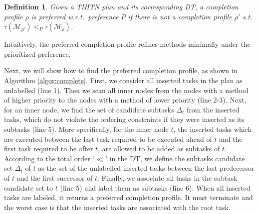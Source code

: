 \documentclass[letterpaper]{article} %
\newtheorem{definition}{Definition}
\newcommand{\Methods}{\mathcal{M}}
\newcommand{\aspprec}{\ll}
\newcommand{\improveFunction}{\rho}
\newcommand{\prefer}{\leq_P}
\newcommand{\strictPrefer}{<_P}
\newcommand{\complete}{\tau}
\newcommand{\inverseComplete}{\complete}
\newcommand{\BEF}{\mathsf{B}}
\newcommand{\AFT}{\mathsf{A}}
\newcommand{\LastBEF}[1]{\mathsf{LastBEF}_{#1}}
\newcommand{\FirstAFT}[1]{\mathsf{FirstAFT}_{#1}}
\newcommand{\SubTCandidates}{\Delta_t}
\begin{document}
\begin{definition}%
Given a TIHTN plan and its corresponding DT, a completion profile $\improveFunction$ is preferred \emph{w.r.t.}\ preference $P$ if there is not a completion profile $\improveFunction'$ s.t. $\inverseComplete(\Methods_{\improveFunction'}) \strictPrefer \inverseComplete(\Methods_{\improveFunction})$. %
\end{definition}
Intuitively, the preferred completion profile refines methods minimally under the prioritized preference.
%

Next, we will show how to find the preferred completion profile, as shown in Algorithm \ref{algor:complete}.
First, we consider all inserted tasks in the plan as unlabelled (line 1).
Then we scan all inner nodes from the nodes with a method of higher priority to the nodes with a method of lower priority (line 2-3).
Next, for an inner node, we find the set of candidate subtasks $\SubTCandidates$ from the inserted tasks, which do not violate the ordering constraints if they were inserted as its subtasks (line 5).
More specifically, for the inner node $t$, the inserted tasks which are executed between the last task required to be executed ahead of $t$ and the first task required to be after $t$, are allowed to be added as subtasks of $t$.
According to the total order `$\aspprec$' in the DT,
we define the subtasks candidate set $\SubTCandidates$ of $t$ as the set of the unlabelled inserted tasks between the last predecessor of $t$ and the first successor of $t$.
Finally, we associate all tasks in the subtask candidate set to $t$ (line 5) and label them as subtasks (line 6).
When all inserted tasks are labeled, it returns a preferred completion profile.
It must terminate and the worst case is that the inserted tasks are associated with the root task.
\end{document}
